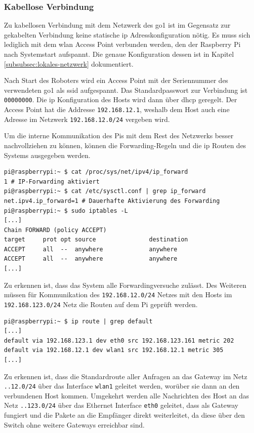 \subsubsection{Kabellose Verbindung}

Zu kabellosen Verbindung mit dem Netzwerk des \gls{go1} ist im Gegensatz zur gekabelten Verbindung keine statische \gls{ip}
Adresskonfiguration nötig.
Es muss sich lediglich mit dem \gls{wlan} Access Point verbunden werden, den der Raspberry Pi nach Systemstart aufspannt.
Die genaue Konfiguration dessen ist in Kapitel \ref{subsubsec:lokales-netzwerk} dokumentiert.

Nach Start des Roboters wird ein Access Point mit der Seriennummer des verwendeten \gls{go1} als \gls{ssid} aufgespannt.
Das Standardpasswort zur Verbindung ist \texttt{00000000}.
Die \gls{ip} Konfiguration des Hosts wird dann über \gls{dhcp} geregelt.
Der Access Point hat die Addresse \texttt{192.168.12.1}, weshalb dem Host auch eine Adresse im Netzwerk
\texttt{192.168.12.0/24} vergeben wird.

Um die interne Kommunikation des Pis mit dem Rest des Netzwerks besser nachvollziehen zu können, können die Forwarding-Regeln
und die \gls{ip} Routen des Systems ausgegeben werden.

\begin{lstlisting}
pi@raspberrypi:~ $ cat /proc/sys/net/ipv4/ip_forward
1 # IP-Forwarding aktiviert
pi@raspberrypi:~ $ cat /etc/sysctl.conf | grep ip_forward
net.ipv4.ip_forward=1 # Dauerhafte Aktivierung des Forwarding
pi@raspberrypi:~ $ sudo iptables -L
[...]
Chain FORWARD (policy ACCEPT)
target     prot opt source               destination
ACCEPT     all  --  anywhere             anywhere
ACCEPT     all  --  anywhere             anywhere
[...]
\end{lstlisting}

\noindent Zu erkennen ist, dass das System alle Forwardingversuche zulässt.
Des Weiteren müssen für Kommunikation des \texttt{192.168.12.0/24} Netzes mit den Hosts im \texttt{192.168.123.0/24} Netz
die Routen auf dem Pi geprüft werden.

\begin{lstlisting}
pi@raspberrypi:~ $ ip route | grep default
[...]
default via 192.168.123.1 dev eth0 src 192.168.123.161 metric 202
default via 192.168.12.1 dev wlan1 src 192.168.12.1 metric 305
[...]
\end{lstlisting}

\noindent Zu erkennen ist, dass die Standardroute aller Anfragen an das Gateway im Netz \texttt{..12.0/24} über das
Interface \texttt{wlan1} geleitet werden, worüber sie dann an den verbundenen Host kommen.
Umgekehrt werden alle Nachrichten des Host an das Netz \texttt{..123.0/24} über das Ethernet Interface \texttt{eth0}
geleitet, dass als Gateway fungiert und die Pakete an die Empfänger direkt weiterleitet, da diese über den Switch ohne
weitere Gateways erreichbar sind.

